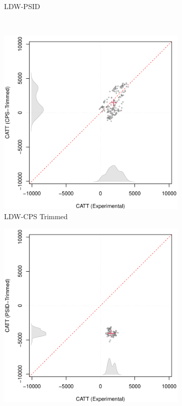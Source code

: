 \documentclass[letterpaper,12pt,leqno]{article}
\begin{document}
\begin{figure}[!ht]
\begin{minipage}[c]{1\textwidth}
\begin{subfigure}{0.4\linewidth}
            \caption{LDW-PSID}
        \end{subfigure}\\
        \begin{subfigure}{0.4\linewidth}
            \includegraphics[width=\linewidth]{catt_no74_cps_trim.pdf}
            \caption{LDW-CPS Trimmed}
        \end{subfigure}
        \begin{subfigure}{0.4\linewidth}
            \includegraphics[width=\linewidth]{catt_no74_PSID_trim.pdf}

\end{subfigure}
\end{minipage}
\end{figure}
\end{document}
